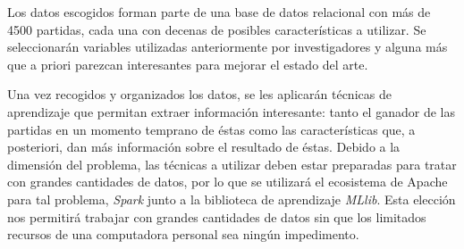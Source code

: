 Los datos escogidos forman parte de una
base de datos relacional con más de 4500 partidas, cada una con decenas de posibles
características a utilizar. Se seleccionarán variables utilizadas anteriormente
por investigadores y alguna más que a priori parezcan interesantes para mejorar
el estado del arte.

Una vez recogidos y organizados los datos, se les aplicarán técnicas de
aprendizaje que permitan extraer información interesante: tanto el ganador
de las partidas en un momento temprano de éstas como las características que,
a posteriori, dan más información sobre el resultado de éstas. Debido a la
dimensión del problema, las técnicas a utilizar deben estar preparadas para
tratar con grandes cantidades de datos, por lo que se utilizará el ecosistema
de Apache para tal problema, \emph{Spark} junto a la biblioteca de aprendizaje
\emph{MLlib}. Esta elección nos permitirá trabajar con grandes cantidades de
datos sin que los limitados recursos de una computadora personal sea ningún
impedimento.


